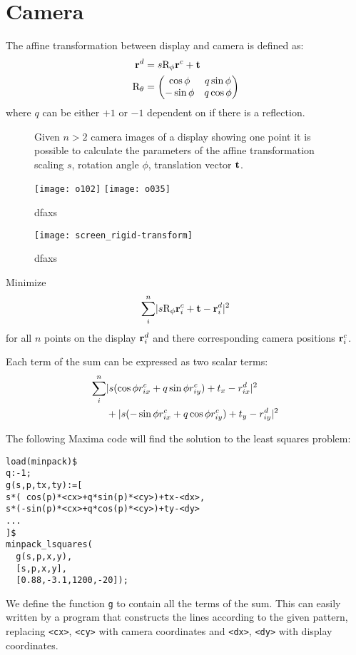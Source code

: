 \chapter{Camera}
\label{sec:rigid}
The affine transformation between display and camera is defined as: 
\begin{align}
  \mathbf{r}^d&=s \textrm{R}_\phi \mathbf{r}^c + \mathbf{t}\\
  \textrm{R}_\theta&=\begin{pmatrix}
  \cos\phi & q\sin\phi \\
  -\sin\phi & q\cos\phi \\ 
  \end{pmatrix}
\end{align}
where $q$ can be either $+1$ or $-1$ dependent on if there is a
reflection.

\begin{figure}[!hbt]
  \centering
  
  \caption{Given $n>2$ camera images of a display showing one point it
    is possible to calculate the parameters of the affine
    transformation scaling $s$, rotation angle $\phi$, translation
    vector $\mathbf{t}$.}
  \label{fig:calib-align}
\end{figure}


\begin{figure}[!hbt]
  \centering
  \texttt{[image: o102]}
  \texttt{[image: o035]}
  \caption{dfaxs}
  \label{fig:rigid-pics}
\end{figure}

\begin{figure}[!hbt]
  \centering
  \texttt{[image: screen\_rigid-transform]}
  \caption{dfaxs}
  \label{fig:screen_rigid-transform}
\end{figure}


Minimize
\begin{align}
  \sum_i^n \mathopen| s \textrm{R}_\phi \mathbf{r}^c_i+\mathbf{t} -\mathbf{r}^d_i \mathclose|^2
\end{align}
for all $n$ points on the display $\mathbf{r}^d_i$ and there corresponding
camera positions $\mathbf{r}^c_i$. 

Each term of the sum can be expressed as two scalar terms:
\begin{align*}
  \sum_i^n&
  \mathopen| s(\cos\phi r^c_{ix}+q\sin\phi r^c_{iy})+t_x-r^d_{ix} \mathclose|^2\\
  &+
  \mathopen| s(-\sin\phi r^c_{ix}+q\cos\phi r^c_{iy})+t_y-r^d_{iy} \mathclose|^2
\end{align*}

The following Maxima code will find the solution to the least squares
problem:
\begin{verbatim}
load(minpack)$
q:-1;
g(s,p,tx,ty):=[
s*( cos(p)*<cx>+q*sin(p)*<cy>)+tx-<dx>,
s*(-sin(p)*<cx>+q*cos(p)*<cy>)+ty-<dy>
...
]$
minpack_lsquares(
  g(s,p,x,y),
  [s,p,x,y],
  [0.88,-3.1,1200,-20]);
\end{verbatim}
We define the function \verb!g! to contain all the terms of the sum.
This can easily written by a program that constructs the lines
according to the given pattern, replacing \verb!<cx>!, \verb!<cy>!
with camera coordinates and \verb!<dx>!, \verb!<dy>! with display
coordinates.

